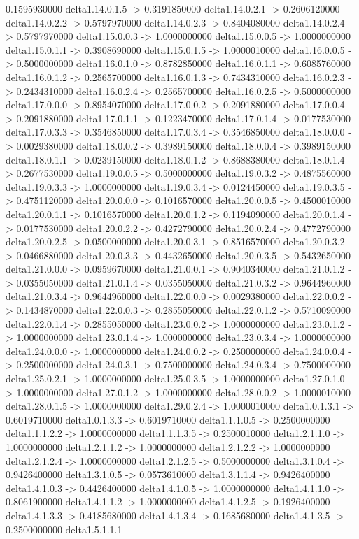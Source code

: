 0.1595930000    delta1.14.0.1.5 -> 0.3191850000    delta1.14.0.2.1 -> 0.2606120000    delta1.14.0.2.2 -> 0.5797970000    delta1.14.0.2.3 -> 0.8404080000    delta1.14.0.2.4 -> 0.5797970000    delta1.15.0.0.3 -> 1.0000000000    delta1.15.0.0.5 -> 1.0000000000    delta1.15.0.1.1 -> 0.3908690000    delta1.15.0.1.5 -> 1.0000010000    delta1.16.0.0.5 -> 0.5000000000    delta1.16.0.1.0 -> 0.8782850000    delta1.16.0.1.1 -> 0.6085760000    delta1.16.0.1.2 -> 0.2565700000    delta1.16.0.1.3 -> 0.7434310000    delta1.16.0.2.3 -> 0.2434310000    delta1.16.0.2.4 -> 0.2565700000    delta1.16.0.2.5 -> 0.5000000000    delta1.17.0.0.0 -> 0.8954070000    delta1.17.0.0.2 -> 0.2091880000    delta1.17.0.0.4 -> 0.2091880000    delta1.17.0.1.1 -> 0.1223470000    delta1.17.0.1.4 -> 0.0177530000    delta1.17.0.3.3 -> 0.3546850000    delta1.17.0.3.4 -> 0.3546850000    delta1.18.0.0.0 -> 0.0029380000    delta1.18.0.0.2 -> 0.3989150000    delta1.18.0.0.4 -> 0.3989150000    delta1.18.0.1.1 -> 0.0239150000    delta1.18.0.1.2 -> 0.8688380000    delta1.18.0.1.4 -> 0.2677530000    delta1.19.0.0.5 -> 0.5000000000    delta1.19.0.3.2 -> 0.4875560000    delta1.19.0.3.3 -> 1.0000000000    delta1.19.0.3.4 -> 0.0124450000    delta1.19.0.3.5 -> 0.4751120000    delta1.20.0.0.0 -> 0.1016570000    delta1.20.0.0.5 -> 0.4500010000    delta1.20.0.1.1 -> 0.1016570000    delta1.20.0.1.2 -> 0.1194090000    delta1.20.0.1.4 -> 0.0177530000    delta1.20.0.2.2 -> 0.4272790000    delta1.20.0.2.4 -> 0.4772790000    delta1.20.0.2.5 -> 0.0500000000    delta1.20.0.3.1 -> 0.8516570000    delta1.20.0.3.2 -> 0.0466880000    delta1.20.0.3.3 -> 0.4432650000    delta1.20.0.3.5 -> 0.5432650000    delta1.21.0.0.0 -> 0.0959670000    delta1.21.0.0.1 -> 0.9040340000    delta1.21.0.1.2 -> 0.0355050000    delta1.21.0.1.4 -> 0.0355050000    delta1.21.0.3.2 -> 0.9644960000    delta1.21.0.3.4 -> 0.9644960000    delta1.22.0.0.0 -> 0.0029380000    delta1.22.0.0.2 -> 0.1434870000    delta1.22.0.0.3 -> 0.2855050000    delta1.22.0.1.2 -> 0.5710090000    delta1.22.0.1.4 -> 0.2855050000    delta1.23.0.0.2 -> 1.0000000000    delta1.23.0.1.2 -> 1.0000000000    delta1.23.0.1.4 -> 1.0000000000    delta1.23.0.3.4 -> 1.0000000000    delta1.24.0.0.0 -> 1.0000000000    delta1.24.0.0.2 -> 0.2500000000    delta1.24.0.0.4 -> 0.2500000000    delta1.24.0.3.1 -> 0.7500000000    delta1.24.0.3.4 -> 0.7500000000    delta1.25.0.2.1 -> 1.0000000000    delta1.25.0.3.5 -> 1.0000000000    delta1.27.0.1.0 -> 1.0000000000    delta1.27.0.1.2 -> 1.0000000000    delta1.28.0.0.2 -> 1.0000010000    delta1.28.0.1.5 -> 1.0000000000    delta1.29.0.2.4 -> 1.0000010000    delta1.0.1.3.1 -> 0.6019710000    delta1.0.1.3.3 -> 0.6019710000    delta1.1.1.0.5 -> 0.2500000000    delta1.1.1.2.2 -> 1.0000000000    delta1.1.1.3.5 -> 0.2500010000    delta1.2.1.1.0 -> 1.0000000000    delta1.2.1.1.2 -> 1.0000000000    delta1.2.1.2.2 -> 1.0000000000    delta1.2.1.2.4 -> 1.0000000000    delta1.2.1.2.5 -> 0.5000000000    delta1.3.1.0.4 -> 0.9426400000    delta1.3.1.0.5 -> 0.0573610000    delta1.3.1.1.4 -> 0.9426400000    delta1.4.1.0.3 -> 0.4426400000    delta1.4.1.0.5 -> 1.0000000000    delta1.4.1.1.0 -> 0.8061900000    delta1.4.1.1.2 -> 1.0000000000    delta1.4.1.2.5 -> 0.1926400000    delta1.4.1.3.3 -> 0.4185680000    delta1.4.1.3.4 -> 0.1685680000    delta1.4.1.3.5 -> 0.2500000000    delta1.5.1.1.1 